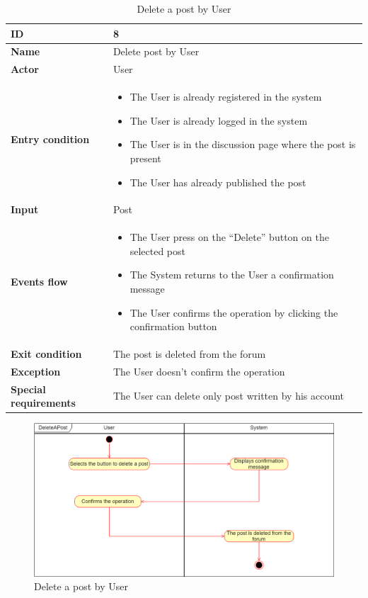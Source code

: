                 \begin{longtable}{p{} | p{}}
        \caption{Delete a post by User}
    \label{tab:user_delete_post}\\
        \hline
        \textbf{ID} & 8\\
        \hline
        \textbf{Name}  &  Delete post by User\\
        \hline
        \textbf{Actor}  &  User\\
        \hline
        \textbf{Entry condition}  &  \begin{itemize}
            \item  The User is already registered in the system
            \item  The User is already logged in the system
            \item  The User is in the discussion page where the post is present
            \item The User has already published the post
        \end{itemize}\\
        \hline
        \textbf{Input} & Post\\
        \hline
        \textbf{Events flow} & \begin{itemize}
                \item The User press on the “Delete” button on the selected post
                \item The System returns to the User a confirmation message
                \item The User confirms the operation by clicking the confirmation button
                \end{itemize}
                 \\
        \hline
        \textbf{Exit condition} & The post is deleted from the forum\\
        \hline
        \textbf{Exception} & The User doesn't confirm the operation\\ \hline
        \textbf{Special requirements} & The User can delete only post written by his account \\ \hline

    
    \end{longtable}
      \begin{figure}[h!]
        \centering
        \includegraphics[scale=0.35]{images/use_cases_diagram/user_delete_post.png}
        \caption{Delete a post by User}
        \label{fig:user_delete_post}
    \end{figure}
    \FloatBarrier